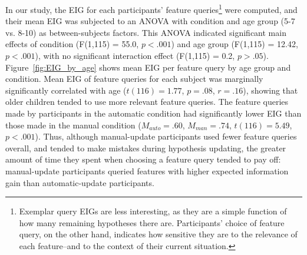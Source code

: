 \documentclass[10pt,letterpaper]{article}
\begin{document}
In our study, the EIG for each participants' feature queries\footnote{Exemplar query EIGs are 
less interesting, as they are a simple function of how many remaining hypotheses 
there are. Participants' choice of feature query, on the other hand, indicates how 
sensitive they are to the relevance of each feature--and to the context of their 
current situation.} were computed, and their mean EIG was 
subjected to an ANOVA with condition and age group (5-7 vs. 8-10) as between-subjects factors. 
This ANOVA indicated significant main effects of condition (F(1,115) = 55.0, $p<.001$) 
and age group (F(1,115) = 12.42, $p<.001$), with no significant interaction effect (F(1,115) = 0.2, $p>.05$).
Figure~\ref{fig:EIG_by_age} shows mean EIG per feature query by age group and condition. Mean 
EIG of feature queries for each subject was marginally significantly correlated with 
age ($t(116)=1.77$, $p=.08$, $r=.16$), showing that older children tended to use 
more relevant feature queries. The feature queries made by participants in the 
automatic condition had significantly lower EIG than those made in the manual 
condition ($M_{auto} = .60$, $M_{man} = .74$, $t(116) = 5.49$,  $p<.001$). Thus, 
although manual-update participants used fewer feature queries overall, and tended 
to make mistakes during hypothesis updating, the greater amount of time they spent 
when choosing a feature query tended to pay off: manual-update participants 
queried features with higher expected information gain than automatic-update 
participants. 


\end{document}
